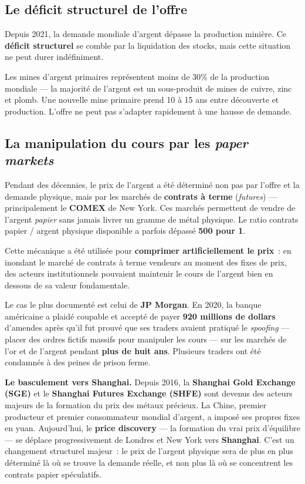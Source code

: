\documentclass[14pt,a4paper]{extarticle}
\begin{document}
\subsection{Le déficit structurel de l'offre}

Depuis 2021, la demande mondiale d'argent dépasse la production minière. Ce \textbf{déficit structurel} se comble par la liquidation des stocks, mais cette situation ne peut durer indéfiniment.

Les mines d'argent primaires représentent moins de 30\% de la production mondiale --- la majorité de l'argent est un sous-produit de mines de cuivre, zinc et plomb. Une nouvelle mine primaire prend 10 à 15 ans entre découverte et production. L'offre ne peut pas s'adapter rapidement à une hausse de demande.

\subsection{La manipulation du cours par les \textit{paper markets}}

Pendant des décennies, le prix de l'argent a été déterminé non pas par l'offre et la demande physique, mais par les marchés de \textbf{contrats à terme} (\textit{futures}) --- principalement le \textbf{COMEX} de New York. Ces marchés permettent de vendre de l'argent \textit{papier} sans jamais livrer un gramme de métal physique. Le ratio contrats papier / argent physique disponible a parfois dépassé \textbf{500 pour 1}.

Cette mécanique a été utilisée pour \textbf{comprimer artificiellement le prix}~: en inondant le marché de contrats à terme vendeurs au moment des fixes de prix, des acteurs institutionnels pouvaient maintenir le cours de l'argent bien en dessous de sa valeur fondamentale.

Le cas le plus documenté est celui de \textbf{JP Morgan}. En 2020, la banque américaine a plaidé coupable et accepté de payer \textbf{920 millions de dollars} d'amendes après qu'il fut prouvé que ses traders avaient pratiqué le \textit{spoofing} --- placer des ordres fictifs massifs pour manipuler les cours --- sur les marchés de l'or et de l'argent pendant \textbf{plus de huit ans}. Plusieurs traders ont été condamnés à des peines de prison ferme.

\medskip

\textbf{Le basculement vers Shanghai.} Depuis 2016, la \textbf{Shanghai Gold Exchange (SGE)} et le \textbf{Shanghai Futures Exchange (SHFE)} sont devenus des acteurs majeurs de la formation du prix des métaux précieux. La Chine, premier producteur et premier consommateur mondial d'argent, a imposé ses propres fixes en yuan. Aujourd'hui, le \textbf{price discovery} --- la formation du vrai prix d'équilibre --- se déplace progressivement de Londres et New York vers \textbf{Shanghai}. C'est un changement structurel majeur~: le prix de l'argent physique sera de plus en plus déterminé là où se trouve la demande réelle, et non plus là où se concentrent les contrats papier spéculatifs.
\end{document}
